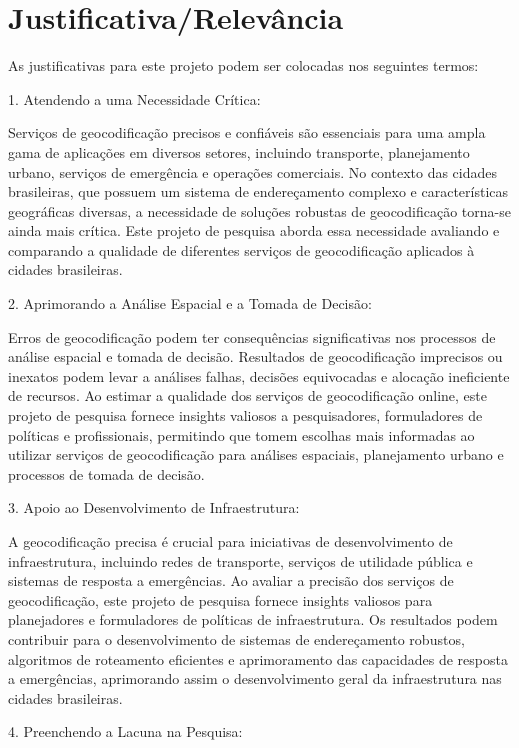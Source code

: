 \documentclass{article}
\begin{document}
\section{Justificativa/Relevância}

As justificativas para este projeto podem ser colocadas nos seguintes termos:

1. Atendendo a uma Necessidade Crítica:

Serviços de geocodificação precisos e confiáveis são essenciais para uma ampla gama de aplicações em diversos setores, incluindo transporte, planejamento urbano, serviços de emergência e operações comerciais. No contexto das cidades brasileiras, que possuem um sistema de endereçamento complexo e características geográficas diversas, a necessidade de soluções robustas de geocodificação torna-se ainda mais crítica. Este projeto de pesquisa aborda essa necessidade avaliando e comparando a qualidade de diferentes serviços de geocodificação aplicados à cidades brasileiras.

2. Aprimorando a Análise Espacial e a Tomada de Decisão:

Erros de geocodificação podem ter consequências significativas nos processos de análise espacial e tomada de decisão. Resultados de geocodificação imprecisos ou inexatos podem levar a análises falhas, decisões equivocadas e alocação ineficiente de recursos. Ao estimar a qualidade dos serviços de geocodificação online, este projeto de pesquisa fornece insights valiosos a pesquisadores, formuladores de políticas e profissionais, permitindo que tomem escolhas mais informadas ao utilizar serviços de geocodificação para análises espaciais, planejamento urbano e processos de tomada de decisão.

3. Apoio ao Desenvolvimento de Infraestrutura:

A geocodificação precisa é crucial para iniciativas de desenvolvimento de infraestrutura, incluindo redes de transporte, serviços de utilidade pública e sistemas de resposta a emergências. Ao avaliar a precisão dos serviços de geocodificação, este projeto de pesquisa fornece insights valiosos para planejadores e formuladores de políticas de infraestrutura. Os resultados podem contribuir para o desenvolvimento de sistemas de endereçamento robustos, algoritmos de roteamento eficientes e aprimoramento das capacidades de resposta a emergências, aprimorando assim o desenvolvimento geral da infraestrutura nas cidades brasileiras.

4. Preenchendo a Lacuna na Pesquisa:
\end{document}
